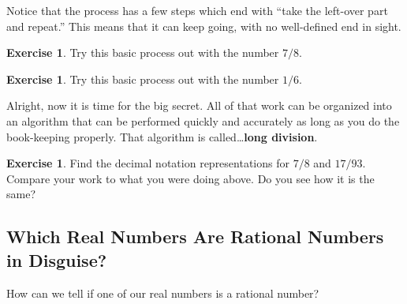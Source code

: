 \documentclass[12pt,letterpaper]{article}
\theoremstyle{definition}
\newtheorem{exercise}[question]{Exercise}
\begin{document}
Notice that the process has a few steps which end with ``take the left-over part and repeat.''
This means that it can keep going, with no well-defined end in sight.


\begin{exercise}
Try this basic process out with the number $7/8$.
\end{exercise}

\begin{exercise}
Try this basic process out with the number $1/6$.
\end{exercise}

Alright, now it is time for the big secret.
All of that work can be organized into an algorithm that can be performed quickly and accurately as long as you do the book-keeping properly.
That algorithm is called\dots \textbf{long division}.

\begin{exercise}
Find the decimal notation representations for $7/8$ and $17/93$.
Compare your work to what you were doing above.
Do you see how it is the same?
\end{exercise}

\subsection*{Which Real Numbers Are Rational Numbers in Disguise?}

How can we tell if one of our real numbers is a rational number?



\end{document}
